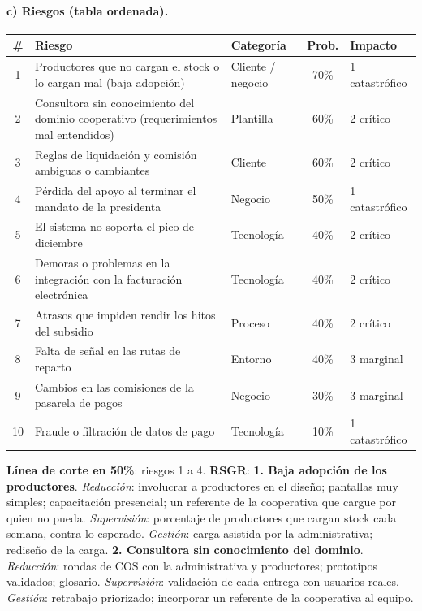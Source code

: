 \documentclass[11pt,a4paper]{article}
\begin{document}
\paragraph{c) Riesgos (tabla ordenada).}
\begin{center}\small
\begin{tabularx}{\textwidth}{@{}c X l c l@{}}
\toprule
\# & Riesgo & Categoría & Prob. & Impacto\\
\midrule
1 & Productores que no cargan el stock o lo cargan mal (baja adopción) & Cliente / negocio & 70\% & 1 catastrófico\\
2 & Consultora sin conocimiento del dominio cooperativo (requerimientos mal entendidos) & Plantilla & 60\% & 2 crítico\\
3 & Reglas de liquidación y comisión ambiguas o cambiantes & Cliente & 60\% & 2 crítico\\
4 & Pérdida del apoyo al terminar el mandato de la presidenta & Negocio & 50\% & 1 catastrófico\\
5 & El sistema no soporta el pico de diciembre & Tecnología & 40\% & 2 crítico\\
6 & Demoras o problemas en la integración con la facturación electrónica & Tecnología & 40\% & 2 crítico\\
7 & Atrasos que impiden rendir los hitos del subsidio & Proceso & 40\% & 2 crítico\\
8 & Falta de señal en las rutas de reparto & Entorno & 40\% & 3 marginal\\
9 & Cambios en las comisiones de la pasarela de pagos & Negocio & 30\% & 3 marginal\\
10 & Fraude o filtración de datos de pago & Tecnología & 10\% & 1 catastrófico\\
\bottomrule
\end{tabularx}
\end{center}
\textbf{Línea de corte en 50\%}: riesgos 1 a 4. \textbf{RSGR}:
\textbf{1. Baja adopción de los productores}. \emph{Reducción}: involucrar a productores en el diseño; pantallas
muy simples; capacitación presencial; un referente de la cooperativa que cargue por quien no pueda.
\emph{Supervisión}: porcentaje de productores que cargan stock cada semana, contra lo esperado.
\emph{Gestión}: carga asistida por la administrativa; rediseño de la carga.
\textbf{2. Consultora sin conocimiento del dominio}. \emph{Reducción}: rondas de COS con la administrativa y
productores; prototipos validados; glosario. \emph{Supervisión}: validación de cada entrega con usuarios reales.
\emph{Gestión}: retrabajo priorizado; incorporar un referente de la cooperativa al equipo.
\end{document}
